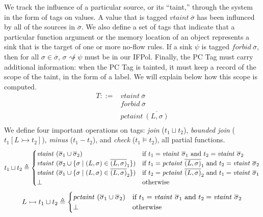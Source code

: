 \documentclass[acmsmall,review,anonymous]{acmart}\settopmatter{printfolios=true,printccs=false,printacmref=false}
\begin{document}
We track the influence of a particular source, or its ``taint,'' through the system in the form
of tags on values. A value that is tagged \(\mathit{vtaint} ~ \overline{\sigma}\) has been influnced
by all of the sources in \(\overline{\sigma}\). We also define a set of tags that indicate that a
particular function argument or the memory location of an object represents a sink that is the
target of one or more no-flow rules. If a sink \(\psi\) is tagged
\(\mathit{forbid} ~ \overline{\sigma}\), then for all \(\sigma \in \overline{\sigma}\),
\(\sigma \not \rightsquigarrow \psi\) must be in our IFPol. Finally, the PC Tag must carry additional
information: when the PC Tag is tainted, it must keep a record of the scope of the taint, in the form
of a label. We will explain below how this scope is computed.
%
\begin{align*}
  T ::= & \mathit{vtaint} ~ \overline{\sigma} \\
  & \mathit{forbid} ~ \overline{\sigma} \\
  & \mathit{pctaint} ~ \overline{(L,\sigma)} \\
\end{align*}
%
We define four important operations on tags: {\em join} (\(t_1 \sqcup t_2\)), {\em bounded join}
(\(t_1 [L \rightarrowtail t_2]\)), {\em minus} (\(t_1 - t_2\)), and {\em check} (\(t_1 \models t_2\)),
all partial functions.
%
\[t_1 \sqcup t_2 \triangleq
\begin{cases}
  \mathit{vtaint} ~ (\overline{\sigma}_1 \cup \overline{\sigma}_2) &
  \textnormal{if } t_1 = \mathit{vtaint} ~ \overline{\sigma}_1 \textnormal{ and }
  t_2 = \mathit{vtaint} ~ \overline{\sigma}_2\\
  \mathit{vtaint} ~ (\overline{\sigma}_2 \cup \{\sigma \mid (L,\sigma) \in \overline{(L,\sigma)}_1\}) &
  \textnormal{if } t_1 = \mathit{pctaint} ~ \overline{(L,\sigma)}_1 \textnormal{ and }
  t_2 = \mathit{vtaint} ~ \overline{\sigma}_2\\
  \mathit{vtaint} ~ (\overline{\sigma}_1 \cup \{\sigma \mid (L,\sigma) \in \overline{(L,\sigma)}_2\}) &
  \textnormal{if } t_2 = \mathit{pctaint} ~ \overline{(L,\sigma)}_2 \textnormal{ and }
  t_1 = \mathit{vtaint} ~ \overline{\sigma}_1\\
  \bot & \textnormal{otherwise} \\
\end{cases}\]
%
\[L \rightarrowtail t_1 \sqcup t_2 \triangleq
\begin{cases}
  \mathit{pctaint} ~ (\overline{\sigma}_1 \cup \overline{\sigma}_2) &
  \textnormal{if } t_1 = \mathit{vtaint} ~ \overline{\sigma}_1 \textnormal{ and }
  t_2 = \mathit{vtaint} ~ \overline{\sigma}_2\\
  \bot & \textnormal{otherwise} \\
\end{cases}\]
\end{document}

